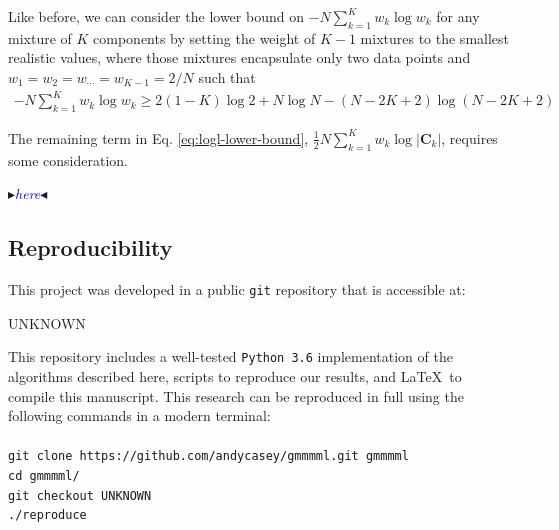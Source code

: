 \documentclass{elsarticle}
\newcommand{\giturl}{UNKNOWN}
\newcommand{\githash}{UNKNOWN}
\newcommand{\nbb}[2]{
    \fcolorbox{black}{cyan}{\bfseries\sffamily\scriptsize#1}
    {\sf$\blacktriangleright$\textcolor{blue}{\textit{#2}}$\blacktriangleleft$}
}
\newcommand{\andy}[1]{\nbb{Andy}{#1}}
\newcommand{\vect}[1]{\boldsymbol{\mathbf{#1}}}
\renewcommand{\vec}[1]{\vect{#1}}
\def\cov{C}
\def\weight{w}
\newcommand{\bashcommand}[1]{\noindent\texttt{#1}\\}
\begin{document}
\noindent{}Like before, we can consider the lower bound on $-N\sum_{k=1}^{K}\weight_{k}\log\weight_k$
for any mixture of $K$ components by setting the weight of $K - 1$ mixtures
to the smallest realistic values, where those mixtures encapsulate only two
data points and $w_{1} = w_2 = w_{\cdots} = w_{K-1} = 2/N$ such that
\begin{eqnarray}
	-N\sum_{k=1}^{K}\weight_{k}\log\weight_k \geq 2(1-K)\log{2} + N\log{N} - (N-2K+2)\log{\left(N - 2K + 2\right)}
\end{eqnarray}




The remaining term in Eq. \ref{eq:logl-lower-bound}, $\frac{1}{2}N\sum_{k=1}^{K}\weight_{k}\log|\vec{\cov}_k|$, requires some  consideration.

\andy{here}


\subsection{Reproducibility} \label{sec:reproducibility}

\noindent{}This project was developed in a public \texttt{git} repository that is 
accessible at:
\begin{center}
\giturl
\end{center}
\noindent{}This repository includes a well-tested \texttt{Python 3.6} implementation
of the algorithms described here, scripts to reproduce our results, and \LaTeX\ to compile this manuscript. This research can be reproduced in full using
the following commands in a modern terminal:\\\\
\bashcommand{git clone https://github.com/andycasey/gmmmml.git gmmmml}
\bashcommand{cd gmmmml/}
\bashcommand{git checkout \githash}
\bashcommand{./reproduce}
\end{document}
